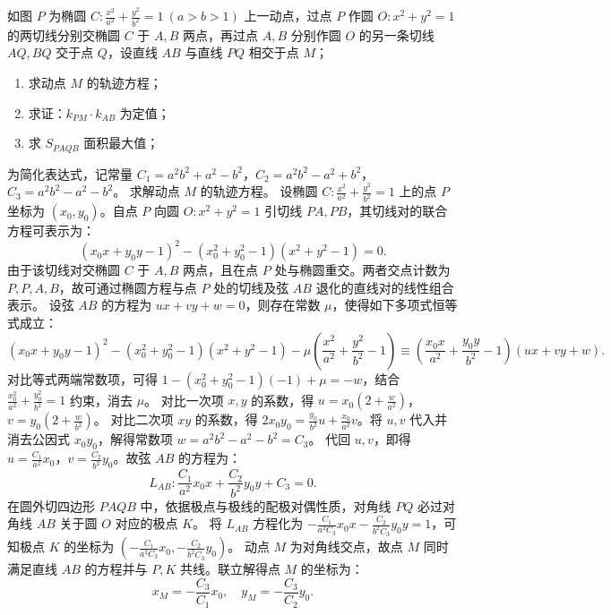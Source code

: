 \begin{exercise}
如图 \(P\) 为椭圆 \(C: \frac{x^2}{a^2} + \frac{y^2}{b^2} = 1\ (a > b > 1)\) 上一动点，过点 \(P\) 作圆 \(O: x^2 + y^2 = 1\) 的两切线分别交椭圆 \(C\) 于 \(A,B\) 两点，再过点 \(A,B\) 分别作圆 \(O\) 的另一条切线 \(AQ,BQ\) 交于点 \(Q\)，设直线 \(AB\) 与直线 \(PQ\) 相交于点 \(M\)；
\begin{enumerate}
    \item 求动点 \(M\) 的轨迹方程；
    \item 求证：\(k_{PM} \cdot k_{AB}\) 为定值；
    \item 求 \(S_{PAQB}\) 面积最大值；
\end{enumerate}
\end{exercise}
\begin{solution}
为简化表达式，记常量 $C_1 = a^2b^2 + a^2 - b^2$，$C_2 = a^2b^2 - a^2 + b^2$，$C_3 = a^2b^2 - a^2 - b^2$。
求解动点 $M$ 的轨迹方程。
设椭圆 $C: \frac{x^2}{a^2} + \frac{y^2}{b^2} = 1$ 上的点 $P$ 坐标为 $(x_0, y_0)$。自点 $P$ 向圆 $O: x^2 + y^2 = 1$ 引切线 $PA, PB$，其切线对的联合方程可表示为：
\[ (x_0 x + y_0 y - 1)^2 - (x_0^2 + y_0^2 - 1)(x^2 + y^2 - 1) = 0. \]
由于该切线对交椭圆 $C$ 于 $A, B$ 两点，且在点 $P$ 处与椭圆重交。两者交点计数为 $P,P,A,B$，故可通过椭圆方程与点 $P$ 处的切线及弦 $AB$ 退化的直线对的线性组合表示。
设弦 $AB$ 的方程为 $ux + vy + w = 0$，则存在常数 $\mu$，使得如下多项式恒等式成立：
\[ (x_0 x + y_0 y - 1)^2 - (x_0^2 + y_0^2 - 1)(x^2 + y^2 - 1) - \mu \left(\frac{x^2}{a^2} + \frac{y^2}{b^2} - 1\right) \equiv \left(\frac{x_0 x}{a^2} + \frac{y_0 y}{b^2} - 1\right)(ux + vy + w). \]
对比等式两端常数项，可得 $1 - (x_0^2+y_0^2-1)(-1) + \mu = -w$，结合 $\frac{x_0^2}{a^2} + \frac{y_0^2}{b^2} = 1$ 约束，消去 $\mu$。
对比一次项 $x, y$ 的系数，得 $u = x_0\left(2 + \frac{w}{a^2}\right)$，$v = y_0\left(2 + \frac{w}{b^2}\right)$。
对比二次项 $xy$ 的系数，得 $2x_0 y_0 = \frac{y_0}{b^2}u + \frac{x_0}{a^2}v$。将 $u, v$ 代入并消去公因式 $x_0 y_0$，解得常数项 $w = a^2b^2 - a^2 - b^2 = C_3$。
代回 $u, v$，即得 $u = \frac{C_1}{a^2} x_0$，$v = \frac{C_2}{b^2} y_0$。故弦 $AB$ 的方程为：
\[ L_{AB}: \frac{C_1}{a^2} x_0 x + \frac{C_2}{b^2} y_0 y + C_3 = 0. \]
在圆外切四边形 $PAQB$ 中，依据极点与极线的配极对偶性质，对角线 $PQ$ 必过对角线 $AB$ 关于圆 $O$ 对应的极点 $K$。
将 $L_{AB}$ 方程化为 $-\frac{C_1}{a^2 C_3} x_0 x - \frac{C_2}{b^2 C_3} y_0 y = 1$，可知极点 $K$ 的坐标为 $\left(-\frac{C_1}{a^2 C_3} x_0, -\frac{C_2}{b^2 C_3} y_0\right)$。
动点 $M$ 为对角线交点，故点 $M$ 同时满足直线 $AB$ 的方程并与 $P, K$ 共线。联立解得点 $M$ 的坐标为：
\[ x_M = -\frac{C_3}{C_1} x_0, \quad y_M = -\frac{C_3}{C_2} y_0. \]

\end{solution}
